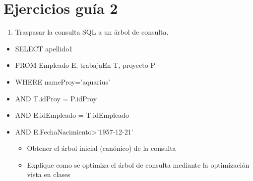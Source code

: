 \documentclass{templateNote}
\begin{document}
\newpage
\section{Ejercicios guía 2}
\begin{enumerate}
    \item Traspasar la consulta SQL a un árbol de consulta.     
\end{enumerate}

\begin{itemize}
    \item SELECT apellido1
    \item FROM Empleado E, trabajaEn T, proyecto P
    \item WHERE nameProy=’aquarius’
    \item AND T.idProy = P.idProy
    \item AND E.idEmpleado = T.idEmpleado
    \item AND E.FechaNacimiento>'1957-12-21'
    \begin{itemize}
        \item Obtener el árbol inicial (canónico) de la consulta

        \begin{center}
        \end{center}

        \item Explique como se optimiza el árbol de consulta mediante la optimización vista en clases
    

\end{itemize}
\end{itemize}
\end{document}
